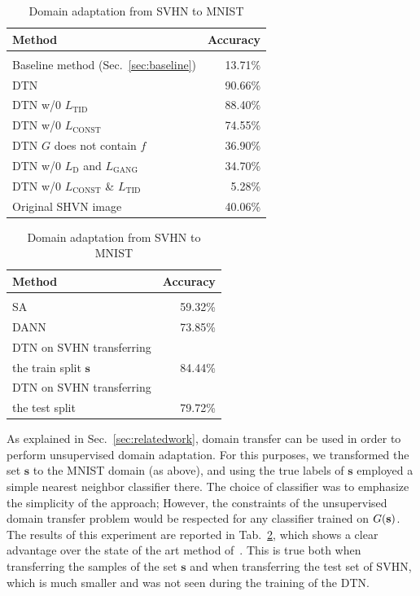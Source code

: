 \documentclass{article} %
\begin{document}
\begin{table}[t]
    \begin{minipage}{.5\linewidth}
      \caption{\label{tab:comparemnist} Accuracy of the MNIST classifier on the sampled transferred by our DTN method from SHVN to MNIST.}
      \centering
       \begin{tabular}{lr}
Method & Accuracy \\ \hline \\
Baseline method (Sec.~\ref{sec:baseline})         & 13.71\% \\
\hline
DTN     & {90.66}\%  \\
DTN w/0 $L_\text{TID}$  & 88.40\%  \\
DTN w/0 $L_\text{CONST}$  & 74.55\%  \\
DTN $G$ does not contain $f$  & 36.90\%  \\
DTN w/0 $L_\text{D}$ and $L_\text{GANG}$  & 34.70\% \\
DTN w/0 $L_\text{CONST}$ \& $L_\text{TID}$   &  5.28\%  \\
\hline
Original SHVN image & 40.06\% \\
\hline
\end{tabular}
    \end{minipage}
\hspace{.4cm}
\begin{minipage}{.40\linewidth}
      \centering
        \caption{\label{tab:domaintransfer}Domain adaptation from SVHN to MNIST}
       \begin{tabular}{lr}
Method & Accuracy \\ \hline \\
SA~\citet{fernando} & 59.32\%\\
DANN~\citet{domaingan} & 73.85\%\\
DTN on SVHN transferring\\
the train split $\mathbf s$ & 84.44\%\\
DTN on SVHN transferring\\
the test split & 79.72\%\\
\hline
\end{tabular}
\vspace{.44567847905in}
\end{minipage} 
\end{table}

As explained in Sec.~\ref{sec:relatedwork}, domain transfer can be used in order to perform unsupervised domain adaptation. For this purposes, we transformed the set $\mathbf s$ to the MNIST domain (as above), and using the true labels of $\mathbf s$ employed a simple nearest neighbor classifier there. The choice of classifier was to emphasize the simplicity of the approach; However, the constraints of the unsupervised domain transfer problem would be respected for any classifier trained on $G(\textbf s)$. The results of this experiment are reported in Tab.~\ref{tab:domaintransfer}, which shows a clear advantage over the state of the art method of~\cite{domaingan}. This is true both when transferring the samples of the set $\mathbf s$ and when transferring the test set of SVHN, which is much smaller and was not seen during the training of the DTN.
\end{document}
